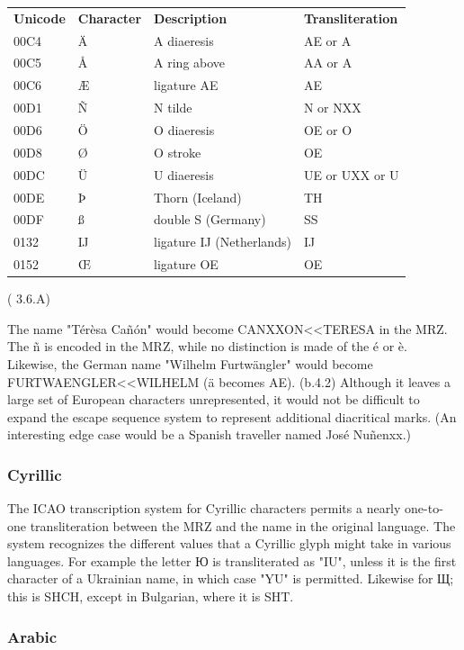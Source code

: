 \begin{tabular}{l|l|l|l}
\textbf{Unicode} & \textbf{Character} & \textbf{Description} &
\textbf{Transliteration} \\
00C4 & Ä & A diaeresis & AE or A \\
00C5 & Å & A ring above & AA or A \\
00C6 & Æ & ligature AE & AE \\
00D1 & Ñ & N tilde & N or NXX \\
00D6 & Ö & O diaeresis & OE or O \\
00D8 & Ø & O stroke & OE \\
00DC & Ü & U diaeresis & UE or UXX or U \\
00DE & Þ & Thorn (Iceland) & TH \\
00DF & ß & double S (Germany) & SS \\
0132 & Ĳ & ligature IJ (Netherlands) & IJ \\
0152 & Œ & ligature OE & OE \\
\end{tabular} (\parencite{icao9309} 3.6.A)

The name "Térèsa Cañón" would become CANXXON<<TERESA in the MRZ. The ñ is
encoded in the MRZ, while no distinction is made of the é or è. Likewise, the
German name "Wilhelm Furtwängler" would become FURTWAENGLER<<WILHELM (ä becomes
AE). (b.4.2) Although it leaves a large set of European characters
unrepresented, it would not be difficult to expand the escape sequence system to
represent additional diacritical marks. (An interesting edge case would be a
Spanish traveller named José Nuñenxx.)

\subsubsection{Cyrillic}

The ICAO transcription system for Cyrillic characters permits a nearly
one-to-one transliteration between the MRZ and the name in the original
language. The system recognizes the different values that a Cyrillic glyph might
take in various languages. For example the letter Ю is transliterated as "IU",
unless it is the first character of a Ukrainian name, in which case "YU" is
permitted. Likewise for Щ; this is SHCH, except in Bulgarian, where it is SHT.

\subsubsection{Arabic}

